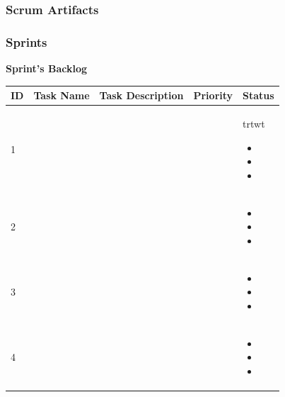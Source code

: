 \documentclass{scrartcl}
\begin{document}
  		\subsubsection{Scrum Artifacts }
  		
  		\subsubsection{Sprints}
  		
%
\textbf{Sprint's Backlog}

\begin{table}[H]
\begin{center}
\begin{tabular}{| p{1cm}|p{3cm}|p{7.5cm}|p{2.5cm} |p{2.5cm} |}
\hline
\rowcolor{LightCyan}
\textbf{ID} & \textbf{Task Name} & \textbf{Task Description}  & \textbf{Priority} & \textbf{Status}\\
\hline

1                   &        & & & trtwt      
\begin{itemize}
\item 
\item
\item



 \end{itemize}\\ \hline
 
2                &     & & &                
\begin{itemize}
\item 
\item
\item


 \end{itemize}\\ \hline
 3                 &     & & &                  
\begin{itemize}
\item 
\item
\item


 \end{itemize}\\ \hline
 4                  &     & & &               
\begin{itemize}

\item 
\item
\item
\end{itemize}\\ \hline
 

\end{tabular}
\end{center}
\end{table}
\end{document}
